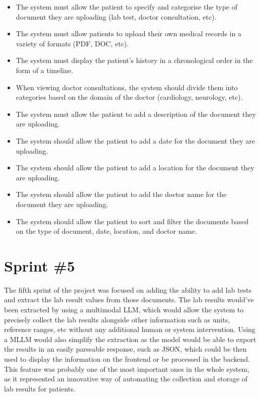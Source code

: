 \begin{itemize}
  \item The system must allow the patient to specify and categorise the type of document they are uploading (lab test, doctor consultation, etc).
  \item The system must allow patients to upload their own medical records in a variety of formats (PDF, DOC, etc).
  \item The system must display the patient's history in a chronological order in the form of a timeline.
  \item When viewing doctor consultations, the system should divide them into categories based on the domain of the doctor (cardiology, neurology, etc).
  \item The system must allow the patient to add a description of the document they are uploading.
  \item The system should allow the patient to add a date for the document they are uploading.
  \item The system should allow the patient to add a location for the document they are uploading.
  \item The system should allow the patient to add the doctor name for the document they are uploading.
  \item The system should allow the patient to sort and filter the documents based on the type of document, date, location, and doctor name. 
\end{itemize}

\section{Sprint \#5}

The fifth sprint of the project was focused on adding the ability to add lab tests and extract the lab result values from those documents. The lab results would've been extracted by using a multimodal LLM, which would allow the system to precisely collect the lab results alongside other information such as units, reference ranges, etc without any additional human or system intervention. Using a MLLM would also simplify the extraction as the model would be able to export the results in an easily parseable response, such as JSON, which could be then used to display the information on the frontend or be processed in the backend. This feature was probably one of the most important ones in the whole system, as it represented an innovative way of automating the collection and storage of lab results for patients.  


